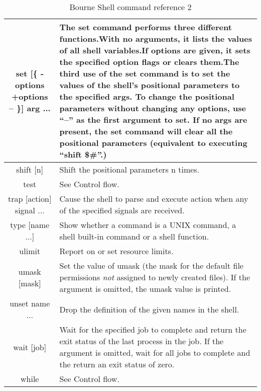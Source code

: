 \begin{table*}[H]
	\begin{tabular}{|c|p{8cm}|}
		\hline
		 set [\{ -options \textbar{} +options \textbar{} -- \}] arg ... &  The set command performs three different functions.With no arguments, it lists the values of all shell variables.If options are given, it sets the specified option flags or clears them.The third use of the set command is to set the values of the shell's positional parameters to the specified args. To change the positional parameters without changing any options, use “--” as the first argument to set. If no args are present, the set command will clear all the positional parameters (equivalent to executing “shift \$\#”.) \\ \hline
		 shift [n] &  Shift the positional parameters n times. \\ \hline
		 test &  See Control flow. \\ \hline
		 trap [action] signal ... &  Cause the shell to parse and execute action when any of the specified signals are received. \\ \hline
		 type [name ...] &  Show whether a command is a UNIX command, a shell built-in command or a shell function. \\ \hline
		 ulimit &  Report on or set resource limits. \\ \hline
		 umask [mask] &  Set the value of umask (the mask for the default file permissions \emph{not} assigned to newly created files). If the argument is omitted, the umask value is printed. \\ \hline
		 unset name ... &  Drop the definition of the given names in the shell. \\ \hline
		 wait [job] &  Wait for the specified job to complete and return the exit status of the last process in the job. If the argument is omitted, wait for all jobs to complete and the return an exit status of zero. \\ \hline
		 while &  See Control flow. \\ \hline
	\end{tabular}
	\caption{Bourne Shell command reference 2}
	\label{tab:refcmd2}
\end{table*}
